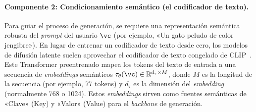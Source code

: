 \documentclass[../../book-main_es.tex]{subfiles}
\begin{document}
\paragraph{Componente 2: Condicionamiento semántico (el codificador de texto).}
Para guiar el proceso de generación, se requiere una representación semántica robusta del 
\textit{prompt} del usuario $\vc$ (por ejemplo, «Un gato peludo de color jengibre»). En lugar de 
entrenar un codificador de texto desde cero, los modelos de difusión latente suelen aprovechar 
el codificador de texto congelado de CLIP~\citep{radford2021learning}. Este Transformer 
preentrenado mapea los tokens del texto de entrada a una secuencia de \textit{embeddings} semánticos 
$\tau_\theta(\vc) \in \mathbb{R}^{d_\tau \times M}$, donde $M$ es la longitud de la secuencia 
(por ejemplo, 77 tokens) y $d_\tau$ es la dimensión del \textit{embedding} (normalmente 768 o 1024). 
Estos \textit{embeddings} sirven como fuentes semánticas de «Clave» (Key) y «Valor» (Value) para el 
\textit{backbone} de generación.
\end{document}
